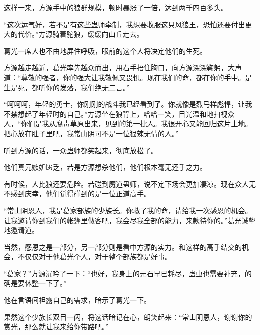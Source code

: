 \begin{this_body}
这样一来，方源手中的狼群规模，顿时暴涨了一倍，达到两千四百多头。

“这次运气好，若不是有这些蛊师牵制，我想要收服这只风狼王，恐怕还要付出更大的代价。”方源骑着驼狼，缓缓向山丘走去。

葛光一席人也不由地屏住呼吸，眼前的这个人将决定他们的生死。

方源越走越近，葛光率先越众而出，用右手捂住胸口，向方源深深鞠躬，大声道：“尊敬的强者，你的强大让我敬佩又畏惧。现在我们的命，都在你的手中。是生是死，都听你的发落，我们绝无二言。”

“呵呵呵，年轻的勇士，你刚刚的战斗我已经看到了。你就像是烈马样彪悍，让我不禁想起了年轻时的自己。”方源坐在狼背上，哈哈一笑，目光温和地扫视众人，“你们是我从腐毒草原出来，见到的第一批人。我很开心又能回归这片土地。把心放在肚子里吧，我常山阴可不是一位狠辣无情的人。”

听到方源的话，一众蛊师都笑起来，彻底放松了。

他们真元嫉妒匮乏，若是方源想杀他们，他们根本毫无还手之力。

有时候，人比狼还要危险。若碰到魔道蛊师，说不定下场会更加凄凉。现在众人无不感到庆幸，他们觉得碰到的是一位正道高手。

“常山阴恩人，我是葛家部族的少族长。你救了我的命，请给我一次感恩的机会。让我邀请你到我们的帐篷里做客吧，我会尽我全部的能力，来款待你的。”葛光诚挚地邀请道。

当然，感恩之是一部分，另一部分则是看中方源的实力。和这样的高手结交的机会，不仅仅对于他葛光个人，对于整个部族都是好事。

“葛家？”方源沉吟了一下：“也好，我身上的元石早已耗尽，蛊虫也需要补充，的确是要休整一下了。”

他在言语间袒露自己的需求，暗示了葛光一下。

果然这个少族长双目一闪，将这话暗记在心，朗笑起来：“常山阴恩人，谢谢你的赏光，那么就让我来给你带路吧。”

\end{this_body}

